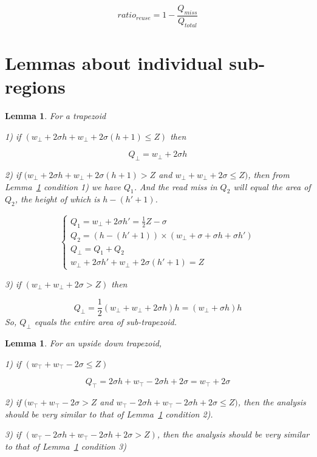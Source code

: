 \documentclass[10pt]{article}
\newtheorem{lemma}[theorem]{Lemma}
\begin{document}
\begin{equation}
ratio_{reuse} = 1 - \frac{Q_{miss}}{Q_{total}}
\end{equation}

\section*{Lemmas about individual sub-regions}
\begin{lemma} \label{lemma:UpTrapezoid}
For a trapezoid

1) if $(w_{\bot} + 2 \sigma h + w_{\bot} + 2 \sigma (h+1) \le Z)$ then 

\begin{equation}
Q_{\bot} = w_{\bot} + 2 \sigma h
\end{equation}

2) if $(w_{\bot} + 2 \sigma h + w_{\bot} + 2 \sigma (h+1) > Z$ and $w_{\bot} + w_{\bot} + 2 \sigma \le Z)$, then  from Lemma~\ref{lemma:UpTrapezoid} condition 1) we have $Q_1$. And the read miss in $Q_2$ will equal the area of $Q_2$, the height of which is $h - (h' + 1)$.

\begin{equation}
\left\lbrace
\begin{array}{l}
Q_1 = w_{\bot} + 2 \sigma h' = \frac{1}{2} Z - \sigma \\
Q_2 = (h - (h' + 1)) \times (w_{\bot} + \sigma + \sigma h + \sigma h') \\
Q_{\bot} = Q_1 + Q_2 \\
w_{\bot} + 2 \sigma h' + w_{\bot} + 2 \sigma (h'+1) = Z
\end{array}
\right.
\end{equation}

3) if $(w_{\bot} + w_{\bot} + 2 \sigma > Z)$ then 

\begin{equation}
Q_{\bot} = \frac{1}{2} (w_{\bot} + w_{\bot} + 2 \sigma h) h = (w_{\bot} + \sigma h) h
\end{equation}
So, $Q_{\bot}$ equals the entire area of sub-trapezoid.
\end{lemma}

\begin{lemma} \label{lemma:DownTrapezoid}
For an upside down trapezoid,

1) if $(w_{\top} + w_{\top} - 2 \sigma \le Z)$

\begin{equation}
Q_{\top} = 2 \sigma h + w_{\top} - 2 \sigma h + 2 \sigma = w_{\top} + 2 \sigma
\end{equation}

2) if $(w_{\top} + w_{\top} - 2 \sigma > Z$ and $w_{\top} - 2 \sigma h + w_{\top} - 2 \sigma h + 2 \sigma \le Z)$, then the analysis should be very similar to that of Lemma~\ref{lemma:UpTrapezoid} condition 2).

3) if $(w_{\top} - 2 \sigma h + w_{\top} - 2 \sigma h + 2 \sigma > Z)$, then the analysis should be very similar to that of Lemma~\ref{lemma:UpTrapezoid} condition 3)
\end{lemma}
\end{document}
